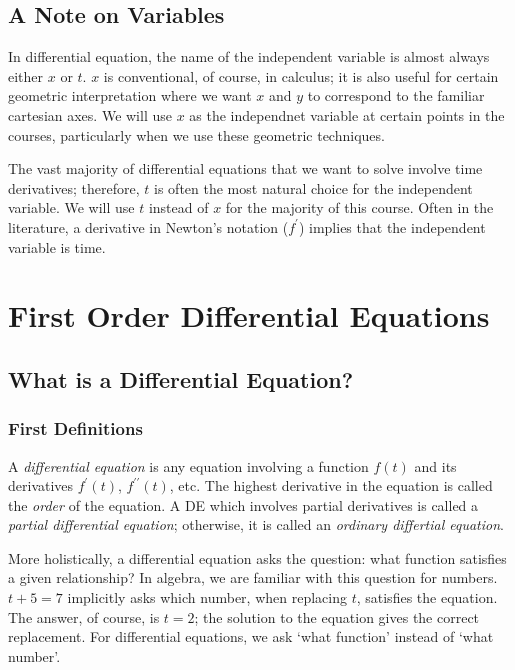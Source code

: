 \documentclass[fleqn,letterpaper]{report}
\begin{document}
\section{A Note on Variables}
\label{note-variables}

In differential equation, the name of the independent variable
is almost always either $x$ or $t$. $x$ is conventional, of
course, in calculus; it is also useful for certain geometric
interpretation where we want $x$ and $y$ to correspond to
the familiar cartesian axes. We will use $x$ as the
independnet variable at certain points in the courses,
particularly when we use these geometric techniques. 

The vast majority of differential equations that we want to
solve involve time derivatives; therefore, $t$ is often the
most natural choice for the independent variable. We will use
$t$ instead of $x$ for the majority of this course. Often in
the literature, a derivative in Newton's notation ($f^\prime$)
implies that the independent variable is time. 

\chapter{First Order Differential Equations}
\label{first-order-odes}

\section{What is a Differential Equation?}
\label{what-is-de}

\subsection{First Definitions}
\label{first-definitions}

\begin{defn}
A \emph{differential equation} is any equation involving a function
$f(t)$ and its derivatives $f^\prime(t)$, $f^{\prime
\prime}(t)$, etc. The highest derivative in the equation is
called the \emph{order} of the equation. A DE which involves
partial derivatives is called a \emph{partial differential
equation}; otherwise, it is called an \emph{ordinary differtial
equation}. 
\end{defn}

More holistically, a differential equation asks the question:
what function satisfies a given relationship? In algebra, we
are familiar with this question for numbers. $t + 5 = 7$
implicitly asks which number, when replacing $t$, satisfies
the equation. The answer, of course, is $t=2$; the solution to
the equation gives the correct replacement. For differential
equations, we ask `what function' instead of `what number'.
\end{document}
